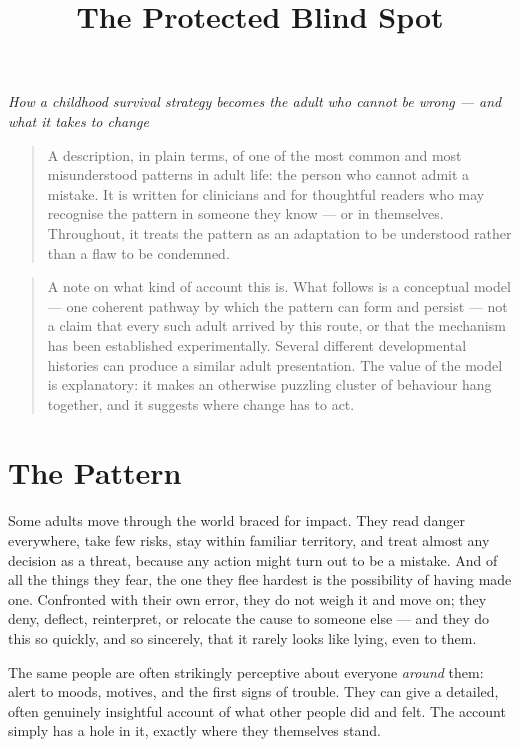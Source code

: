 \documentclass{article}
\title{The Protected Blind Spot}
\author{}
\date{}
\begin{document}
\maketitle

\begin{center}
\textit{How a childhood survival strategy becomes the adult who cannot be wrong --- and what it takes to change}
\end{center}

\begin{quotation}
A description, in plain terms, of one of the most common and most misunderstood patterns in adult life: the person who cannot admit a mistake. It is written for clinicians and for thoughtful readers who may recognise the pattern in someone they know --- or in themselves. Throughout, it treats the pattern as an adaptation to be understood rather than a flaw to be condemned.
\end{quotation}

\begin{quotation}
A note on what kind of account this is. What follows is a conceptual model --- one coherent pathway by which the pattern can form and persist --- not a claim that every such adult arrived by this route, or that the mechanism has been established experimentally. Several different developmental histories can produce a similar adult presentation. The value of the model is explanatory: it makes an otherwise puzzling cluster of behaviour hang together, and it suggests where change has to act.
\end{quotation}

\section*{The Pattern}

Some adults move through the world braced for impact. They read danger everywhere, take few risks, stay within familiar territory, and treat almost any decision as a threat, because any action might turn out to be a mistake. And of all the things they fear, the one they flee hardest is the possibility of having made one. Confronted with their own error, they do not weigh it and move on; they deny, deflect, reinterpret, or relocate the cause to someone else --- and they do this so quickly, and so sincerely, that it rarely looks like lying, even to them.

The same people are often strikingly perceptive about everyone \textit{around} them: alert to moods, motives, and the first signs of trouble. They can give a detailed, often genuinely insightful account of what other people did and felt. The account simply has a hole in it, exactly where they themselves stand.
\end{document}
